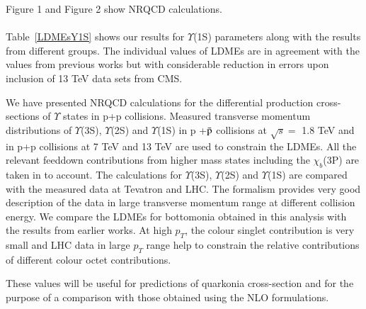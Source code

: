Figure 1 and Figure 2 show NRQCD calculations.
\ \\
\ \\


Table~\ref{LDMEsY1S} shows our results for $\Upsilon$(1S) parameters along with
the results from different groups. The individual values of LDMEs are in agreement with
the values from previous works but with considerable reduction in 
errors upon inclusion of 13 TeV data sets from CMS.

We have presented NRQCD calculations for the differential production 
cross-sections of $\Upsilon$ states in  p+p collisions.  Measured transverse momentum
distributions of $\Upsilon$(3S), 
$\Upsilon$(2S) and $\Upsilon$(1S) in p +{$\bar {\rm p}$} collisions at $\sqrt{s}=$ 1.8 TeV and in 
p+p collisions at 7 TeV and 13 TeV are used to constrain the LDMEs. All the relevant feeddown
contributions from higher mass states including the $\chi_{b}$(3P) are taken in to account.
The calculations for  $\Upsilon$(3S), $\Upsilon$(2S) and $\Upsilon$(1S) are compared with 
the measured data at Tevatron and LHC. The formalism provides  very good description of the data in 
large transverse momentum range at different collision energy. 
We compare the LDMEs for bottomonia obtained in this analysis with the results from earlier works.
At high $p_T$, the colour singlet contribution is very small and LHC data in large $p_T$ range 
help to constrain the relative contributions of different colour octet contributions.


These values will be useful for predictions
of quarkonia cross-section and for the purpose of a comparison with those obtained using the NLO formulations.
